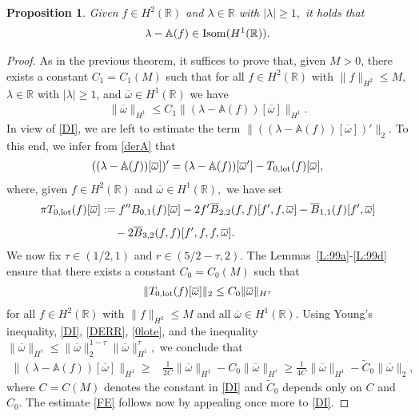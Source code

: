 \documentclass[11pt,reqno]{amsart}
\numberwithin{equation}{section}
\newcommand{\0}{\Omega}
\newcommand{\wt}{\widetilde}
\newcommand{\ov}{\overline}
\newcommand{\oo}{\ov\omega}
\newcommand{\bA}{\mathbb{A}}
\newcommand{\R}{\mathbb{R}}
\newtheorem{prop}[thm]{Proposition}
\numberwithin{equation}{section}
\begin{document}
\begin{prop}\label{P:I2} 
Given  $f\in H^2(\R)$  and $\lambda\in\R$ with $|\lambda|\geq 1,$  it holds   that
\begin{align*} 
 \lambda-\bA(f)\in {\rm Isom}(H^1(\R)).
\end{align*}
\end{prop}
\begin{proof}
As in the previous theorem, it suffices to prove that, given $M>0$, there exists a constant $C_1=C_1(M)$ such that for all $f\in H^2(\R)$ with $\|f\|_{H^2}\leq M$, $\lambda\in\R$ with $|\lambda|\geq1$, and $\oo\in H^1(\R)$ we have  
 \begin{align}\label{FE}
  \|\oo\|_{H^1}\leq C_1\|(\lambda-\bA(f))[\oo]\|_{H^1}.
 \end{align}
 In view of \eqref{DI}, we are left to estimate  the term $\|((\lambda-\bA(f))[\oo])'\|_2$. 
 To this end, we  infer from \eqref{derA} that 
 \begin{align}\label{DERR}
       ((\lambda-\bA(f))[\oo])'=(\lambda-\bA(f))[\oo'] -T_{0,\rm lot}(f)[\oo], 
 \end{align}
 where, given $f\in H^2(\R)$ and $\oo \in H^1(\R),$ we have set
 \begin{align}
  \pi T_{0,\rm lot}(f)[\oo]&:=f''B_{0,1}( f)[\oo]-2f'\ov B_{2,2}(f,f)[f',f,\oo]-\ov B_{1,1}( f)[f', \oo]\nonumber\\[1ex]
  &\hspace{0.424cm}- 2\ov B_{3,2}( f,f)[f',f,f,\oo].\label{0lot}
 \end{align}
We now fix $\tau\in (1/2,1)$ and  $r\in (5/2-\tau,2)$. 
The Lemmas~\ref{L:99a}-\ref{L:99d} ensure that there exists a constant $C_0=C_0(M)$ such that 
  \begin{align}\label{0lote}
 \|T_{0,\rm lot}(f)[\oo] \|_2\leq C_0 \|\oo\|_{H^\tau} 
\end{align}
for all $f\in H^2(\R)$ with $\|f\|_{H^2}\leq M$ and all $\oo\in H^1(\R)$.
Using Young's inequality,   \eqref{DI}, \eqref{DERR},  \eqref{0lote}, and the inequality $\|\oo\|_{H^\tau}\leq \|\oo\|_2^{1-\tau}\|\oo\|_{H^1}^\tau,$ we conclude that 
\begin{align*}
 \|(\lambda-\bA(f))[\oo]\|_{H^1}\geq& \frac{1}{2C}\|\oo\|_{H^1}-C_0\|\oo\|_{H^\tau}\geq \frac{1}{4C}\|\oo\|_{H^1}-\wt C_0\|\oo\|_{2},
\end{align*}
where $C=C(M)$ denotes  the constant in \eqref{DI} and $\wt C_0$ depends only on $  C $ and $C_0$.
The estimate \eqref{FE} follows now by appealing once more to \eqref{DI}. 
\end{proof}
 
\end{document}
